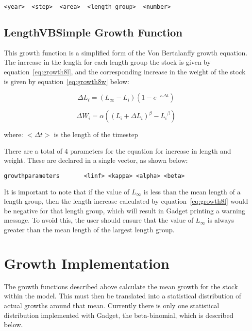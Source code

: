 \documentclass[10pt,twoside]{book}
\begin{document}
{\small\begin{verbatim}
<year>  <step>  <area>  <length group>  <number>
\end{verbatim}}

\subsection{LengthVBSimple Growth Function}\label{subsec:growth8}
This growth function is a simplified form of the Von Bertalanffy growth equation.  The increase in the length for each length group the stock is given by equation~\ref{eq:growth8l}, and the corresponding increase in the weight of the stock is given by equation~\ref{eq:growth8w} below:

\begin{equation}\label{eq:growth8l}
\Delta L_{i} = \left( L_{\infty} - L_{i} \right) \left( 1 - e^{-\kappa \Delta t} \right)
\end{equation}

\begin{equation}\label{eq:growth8w}
\Delta W_{i} = \alpha \left( \left( L_{i} + \Delta L_{i} \right) ^{\beta} - {L_{i}}^{\beta} \right)
\end{equation}

where:\newline
$<\Delta t>$ is the length of the timestep

\bigskip
There are a total of 4 parameters for the equation for increase in length and weight.  These are declared in a single vector, as shown below:

{\small\begin{verbatim}
growthparameters       <linf> <kappa> <alpha> <beta>
\end{verbatim}}

It is important to note that if the value of $L_{\infty}$ is less than the mean length of a length group, then the length increase calculated by equation~\ref{eq:growth8l} would be negative for that length group, which will result in Gadget printing a warning message.  To avoid this, the user should ensure that the value of $L_{\infty}$ is always greater than the mean length of the largest length group.

\section{Growth Implementation}\label{sec:stockgrowthimplement}
The growth functions described above calculate the mean growth for the stock within the model. This must then be translated into a statistical distribution of actual growths around that mean.  Currently there is only one statistical distribution implemented with Gadget, the beta-binomial, which is described below.
\end{document}
